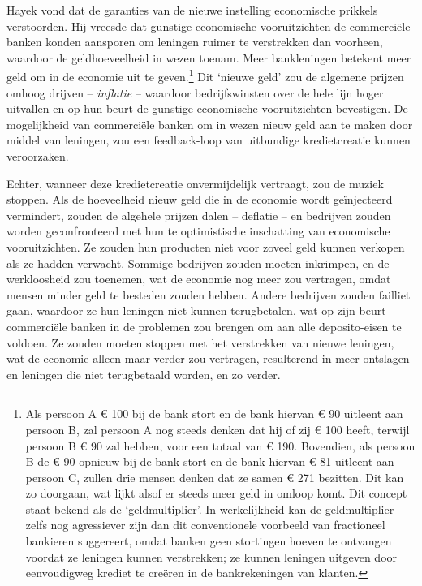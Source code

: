 \documentclass[smalldemyvopaper,11pt,twoside,onecolumn,openright,extrafontsizes,hidelinks]{memoir}
\begin{document}
Hayek vond dat de garanties van de nieuwe instelling economische
prikkels verstoorden. Hij vreesde dat gunstige economische
vooruitzichten de commerciële banken konden aansporen om leningen ruimer
te verstrekken dan voorheen, waardoor de geldhoeveelheid in wezen
toenam. Meer bankleningen betekent meer geld om in de economie uit te
geven.\footnote{Als persoon A € 100 bij de bank stort en de bank hiervan
  € 90 uitleent aan persoon B, zal persoon A nog steeds denken dat hij
  of zij € 100 heeft, terwijl persoon B € 90 zal hebben, voor een totaal
  van € 190. Bovendien, als persoon B de € 90 opnieuw bij de bank stort
  en de bank hiervan € 81 uitleent aan persoon C, zullen drie mensen
  denken dat ze samen € 271 bezitten. Dit kan zo doorgaan, wat lijkt
  alsof er steeds meer geld in omloop komt. Dit concept staat bekend als
  de `geldmultiplier'. In werkelijkheid kan de geldmultiplier zelfs nog
  agressiever zijn dan dit conventionele voorbeeld van fractioneel
  bankieren suggereert, omdat banken geen stortingen hoeven te ontvangen
  voordat ze leningen kunnen verstrekken; ze kunnen leningen uitgeven
  door eenvoudigweg krediet te creëren in de bankrekeningen van klanten.}
Dit `nieuwe geld' zou de algemene prijzen omhoog drijven --
\emph{inflatie} -- waardoor bedrijfswinsten over de hele lijn hoger
uitvallen en op hun beurt de gunstige economische vooruitzichten
bevestigen. De mogelijkheid van commerciële banken om in wezen nieuw
geld aan te maken door middel van leningen, zou een feedback-loop van
uitbundige kredietcreatie kunnen veroorzaken.

Echter, wanneer deze kredietcreatie onvermijdelijk vertraagt, zou de
muziek stoppen. Als de hoeveelheid nieuw geld die in de economie wordt
geïnjecteerd vermindert, zouden de algehele prijzen dalen -- deflatie --
en bedrijven zouden worden geconfronteerd met hun te optimistische
inschatting van economische vooruitzichten. Ze zouden hun producten niet
voor zoveel geld kunnen verkopen als ze hadden verwacht. Sommige
bedrijven zouden moeten inkrimpen, en de werkloosheid zou toenemen, wat
de economie nog meer zou vertragen, omdat mensen minder geld te besteden
zouden hebben. Andere bedrijven zouden failliet gaan, waardoor ze hun
leningen niet kunnen terugbetalen, wat op zijn beurt commerciële banken
in de problemen zou brengen om aan alle deposito-eisen te voldoen. Ze
zouden moeten stoppen met het verstrekken van nieuwe leningen, wat de
economie alleen maar verder zou vertragen, resulterend in meer ontslagen
en leningen die niet terugbetaald worden, en zo verder.
\end{document}
